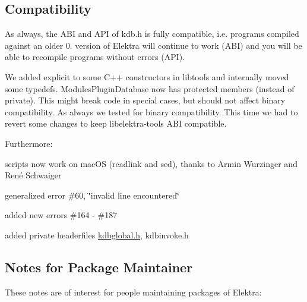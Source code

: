 \subsection*{Compatibility}

As always, the A\+BI and A\+PI of kdb.\+h is fully compatible, i.\+e. programs compiled against an older 0. version of Elektra will continue to work (A\+BI) and you will be able to recompile programs without errors (A\+PI).

We added {\ttfamily explicit} to some C++ constructors in libtools and internally moved some typedefs. Modules\+Plugin\+Database now has protected members (instead of private). This might break code in special cases, but should not affect binary compatibility. As always we tested for binary compatibility. This time we had to revert some changes to keep libelektra-\/tools A\+BI compatible.

Furthermore\+:


\begin{DoxyItemize}
\item scripts now work on mac\+OS (readlink and sed), thanks to Armin Wurzinger and René Schwaiger
\item generalized error \#60, \char`\"{}invalid line encountered\char`\"{}
\item added new errors \#164 -\/ \#187
\item added private headerfiles {\ttfamily \hyperlink{kdbglobal_8h}{kdbglobal.\+h}}, {\ttfamily kdbinvoke.\+h}
\end{DoxyItemize}

\subsection*{Notes for Package Maintainer}

These notes are of interest for people maintaining packages of Elektra\+:


